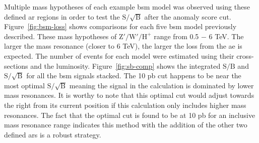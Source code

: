 Multiple mass hypotheses of each example \gls{bsm} model was observed using these defined \gls{ar} regions in order to test the $\textrm{S}/\sqrt{\textrm{B}}$ after the anomaly score cut. Figure~\ref{fig:bsm-loss} shows comparisons for each five 
\gls{bsm} model previously described. These mass hypotheses of $\textrm{Z}' / \textrm{W}' / \textrm{H}^{+}$ range from 0.5 $-$ 6 TeV. The larger the mass resonance (closer to 6 TeV), the larger the loss from the 
\gls{ae} is expected. The number of events for each model were estimated using their cross-sections and the luminosity. Figure~\ref{fig:sb-comp} shows the integrated $\textrm{S}/\textrm{B}$ and $\textrm{S}/\sqrt{\textrm{B}}$ for all the \gls{bsm} signals stacked. 
The 10 pb cut happens to be near the most optimal $\textrm{S}/\sqrt{\textrm{B}}$ meaning the signal in the calculation is dominated by lower mass resonances. It is worthy to note that this optimal cut would adjust towards the right
from its current position if this calculation only includes higher mass resonances. The fact that the optimal cut is found to be at 10 pb for an inclusive mass resonance range indicates this method with the 
addition of the other two defined \gls{ar}s is a robust strategy.
\newpage

